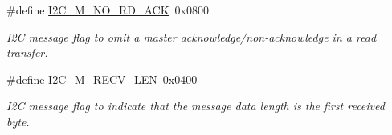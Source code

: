 \begin{DoxyCompactItemize}
\#define \mbox{\hyperlink{group__I2CLinux_gadb8351c5c02ca2b6909baa9d374ff6d4}{I2\+C\+\_\+\+M\+\_\+\+N\+O\+\_\+\+R\+D\+\_\+\+A\+CK}}~0x0800
\begin{DoxyCompactList}\small\item\em I2C message flag to omit a master acknowledge/non-\/acknowledge in a read transfer. \end{DoxyCompactList}\item 
\#define \mbox{\hyperlink{group__I2CLinux_gad1b3262018276534d433daaf96648480}{I2\+C\+\_\+\+M\+\_\+\+R\+E\+C\+V\+\_\+\+L\+EN}}~0x0400
\begin{DoxyCompactList}\small\item\em I2C message flag to indicate that the message data length is the first received byte. \end{DoxyCompactList}\end{DoxyCompactItemize}
